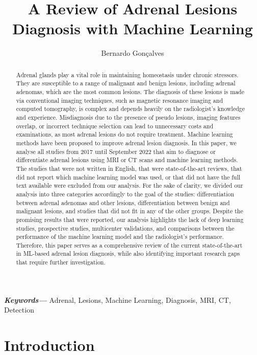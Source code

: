 \documentclass[11pt]{article}
\title{A Review of Adrenal Lesions Diagnosis with Machine Learning}
\author{Bernardo Gonçalves}
\providecommand{\keywords}[1]{  \small  \textbf{\textit{Keywords---}} #1}
\begin{document}
\maketitle

\begin{abstract}

    Adrenal glands play a vital role in maintaining homeostasis under chronic
    stressors. They are susceptible to a range of malignant and benign lesions,
    including adrenal adenomas, which are the most common lesions. The
    diagnosis of these lesions is made via conventional imaging techniques, such
    as magnetic resonance imaging and computed tomography, is complex and
    depends heavily on the radiologist's knowledge and experience. Misdiagnosis due to the
    presence of pseudo lesions, imaging features overlap, or incorrect technique
    selection can lead to unnecessary costs and examinations, as most adrenal
    lesions do not require treatment. Machine learning methods have been
    proposed to improve adrenal lesion diagnosis.
    In this paper, we analyse all
    studies from 2017 until September 2022 that aim to diagnose or differentiate
    adrenal lesions using MRI or CT scans and machine learning methods.
    The studies that were not written in
    English, that were state-of-the-art reviews, that did not report which
    machine learning model was used, or that did not have the full text
    available were excluded from our analysis. For the sake of clarity, we
    divided our analysis into three categories accordingly to the goal of the
    studies: differentiation between adrenal adenomas and other lesions,
    differentiation between benign and malignant lesions, and studies that did
    not fit in any of the other groups. Despite the promising results that were
    reported, our analysis highlights the lack of deep learning studies,
    prospective studies, multicenter validations, and comparisons between the
    performance of the machine learning model and the radiologist's performance.
    Therefore, this paper serves as a comprehensive review of the current
    state-of-the-art in ML-based adrenal lesion diagnosis, while also
    identifying important research gaps that require further investigation.

\end{abstract}

\keywords{Adrenal, Lesions, Machine Learning, Diagnosis, MRI, CT, Detection}

\section{Introduction}
\end{document}
